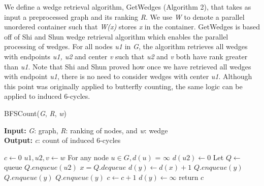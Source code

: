 \documentclass[11pt]{article}
\begin{document}
We define a wedge retrieval algorithm, GetWedges (Algorithm 2), that takes as input a preprocessed graph and its ranking \textit{R}.
We use \textit{W} to denote a parallel unordered container such that \textit{W(x)} stores \textit{x} in the container.
GetWedges is based off of Shi and Shun \cite{shi2019parallel} wedge retrieval algorithm which enables the parallel processing of wedges.
For all nodes \textit{u1} in \textit{G}, the algorithm retrieves all wedges with endpoints \textit{u1, u2} and center \textit{v} such that \textit{u2} and \textit{v} both have rank greater than \textit{u1}.
Note that Shi and Shun proved how once we have retrieved all wedges with endpoint \textit{u1}, there is no need to consider wedges with center \textit{u1}.
Although this point was originally applied to butterfly counting, the same logic can be applied to induced 6-cycles.

\begin{algorithm}[H]
\caption{BFSCount(\textit{G}, \textit{R}, \textit{w})}
\hspace*{\algorithmicindent} \textbf{Input:} \textit{G}: graph, \textit{R}: ranking of nodes, and \textit{w}: wedge \\
\hspace*{\algorithmicindent} \textbf{Output:} \textit{c}: count of induced 6-cycles
\begin{algorithmic}[1]
    \State $c \gets 0$
    \State $u1, u2, v \gets w$
    \State For any node $u \in G, d(u)$ = $\infty$
    \State $d(u2) \gets 0$
    \State Let $Q \gets$ queue
    \State $Q.enqueue(u2)$
        \State $x = Q.dequeue$
                \State $d(y) \gets d(x) + 1$
                        \State $Q.enqueue(y)$
                    \EndIf
                        \State $Q.enqueue(y)$
                    \EndIf
                        \State $Q.enqueue(y)$
                    \EndIf
                \Else
                        \State $c \gets c + 1$
                        \State $d(y) \gets \infty$
                    \EndIf
                \EndIf
            \EndIf
        \EndFor
    \EndWhile
    \State return $c$
\end{algorithmic}
\end{algorithm}
\end{document}
